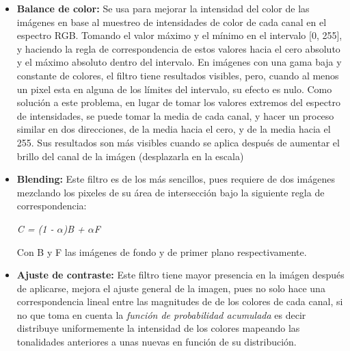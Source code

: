 \documentclass[12pt]{article}
\begin{document}
\begin{description}
  \begin{itemize}
     \item \textbf{Balance de color:} Se usa para mejorar la intensidad del color de las im\'agenes en base 
     al muestreo de intensidades de color de cada canal en el espectro RGB. Tomando el valor m\'aximo y el m\'inimo
     en el intervalo [0, 255], y haciendo la regla de correspondencia de estos valores hacia el cero absoluto y el m\'aximo
     absoluto dentro del intervalo. En im\'agenes con una gama baja y constante de colores, el filtro tiene resultados 
     visibles, pero, cuando al menos un pixel esta en alguna de los l\'imites del intervalo, su efecto es nulo. 
     Como soluci\'on a este problema, en lugar de tomar los valores extremos del espectro de intensidades, se puede tomar la
     media de cada canal, y hacer un proceso similar en dos direcciones, de la media hacia el cero, y de la media hacia el 255. Sus resultados son m\'as visibles cuando se aplica despu\'es de aumentar el brillo del canal de la im\'agen (desplazarla en la escala)
     
     \item \textbf{Blending:} Este filtro es de los m\'as sencillos, pues requiere de dos im\'agenes mezclando los
     pixeles de su \'area de intersecci\'on bajo la siguiente regla de correspondencia:
     
   \begin{center}
       \textit{ C = (1 - $\alpha$)B + $\alpha$F}
    \end{center}
     Con B y F las im\'agenes de fondo y de primer plano respectivamente.
     
    \item \textbf{Ajuste de contraste:} Este filtro tiene mayor presencia en la im\'agen despu\'es de aplicarse,
    mejora el ajuste general de la imagen, pues no solo hace una correspondencia lineal entre las magnitudes de
    de los colores de cada canal, si no que toma en cuenta la \textit{funci\'on de probabilidad acumulada} es decir
    distribuye uniformemente la intensidad de los colores mapeando las tonalidades anteriores a unas nuevas en 
    funci\'on de su distribuci\'on.
    

\end{itemize}
\end{description}
\end{document}
